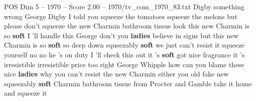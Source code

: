 \begin{textsample}{POS Dim 5 – 1970 – Score 2.00 – 1970/tv\_com\_1970\_83.txt}  \label{ex:f5_pos_053}
Digby something wrong George Digby I told you squeeze the tomatoes squeeze the melons but please don't squeeze the new Charmin bathroom tissue look this new Charmin is so \textbf{soft} I 'll handle this George don't you \textbf{ladies} believe in signs but this new Charmin is so \textbf{soft} so deep down squeezably \textbf{soft} we just can't resist it squeeze yourself no no he 's on duty I 'll check this out it 's \textbf{soft} got nice fragrance it 's irresistible irresistible price too right George Whipple how can you blame these nice \textbf{ladies} why you can't resist the new Charmin either you old fake new squeezably \textbf{soft} Charmin bathroom tissue from Procter and Gamble take it home and squeeze it

\end{textsample}
